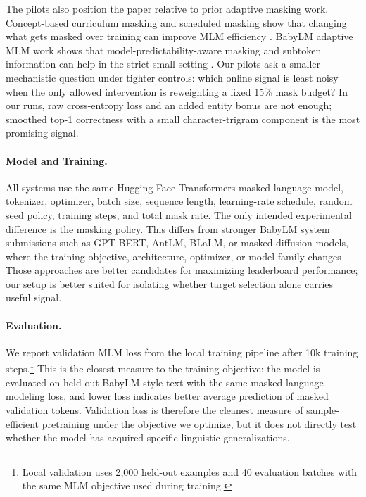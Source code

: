 The pilots also position the paper relative to prior adaptive masking work. Concept-based curriculum masking and scheduled masking show that changing what gets masked over training can improve MLM efficiency \citep{lee2022efficient,yang2023learning}. BabyLM adaptive MLM work shows that model-predictability-aware masking and subtoken information can help in the strict-small setting \citep{edman2025mask}. Our pilots ask a smaller mechanistic question under tighter controls: which online signal is least noisy when the only allowed intervention is reweighting a fixed 15\% mask budget? In our runs, raw cross-entropy loss and an added entity bonus are not enough; smoothed top-1 correctness with a small character-trigram component is the most promising signal.

\paragraph{Model and Training.}
All systems use the same Hugging Face Transformers masked language model, tokenizer, optimizer, batch size, sequence length, learning-rate schedule, random seed policy, training steps, and total mask rate. The only intended experimental difference is the masking policy. This differs from stronger BabyLM system submissions such as GPT-BERT, AntLM, BLaLM, or masked diffusion models, where the training objective, architecture, optimizer, or model family changes \citep{charpentier2024gptbert,yu2024antlm,haller2025sample,kosmopoulou2025masked}. Those approaches are better candidates for maximizing leaderboard performance; our setup is better suited for isolating whether target selection alone carries useful signal.

\paragraph{Evaluation.}
We report validation MLM loss from the local training pipeline after 10k training steps.\footnote{Local validation uses 2{,}000 held-out examples and 40 evaluation batches with the same MLM objective used during training.} This is the closest measure to the training objective: the model is evaluated on held-out BabyLM-style text with the same masked language modeling loss, and lower loss indicates better average prediction of masked validation tokens. Validation loss is therefore the cleanest measure of sample-efficient pretraining under the objective we optimize, but it does not directly test whether the model has acquired specific linguistic generalizations.

